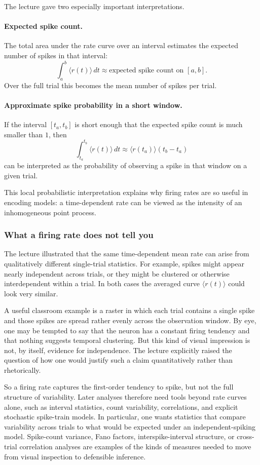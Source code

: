 \documentclass[11pt]{article}
\begin{document}
The lecture gave two especially important interpretations.

\paragraph{Expected spike count.}
The total area under the rate curve over an interval estimates the expected number of spikes in that interval:
\[
\int_a^b \langle r(t) \rangle\,dt \approx \text{expected spike count on } [a,b].
\]
Over the full trial this becomes the mean number of spikes per trial.

\paragraph{Approximate spike probability in a short window.}
If the interval $[t_a,t_b]$ is short enough that the expected spike count is much smaller than $1$, then
\[
\int_{t_a}^{t_b} \langle r(t) \rangle\,dt
\approx \langle r(t_a) \rangle (t_b-t_a)
\]
can be interpreted as the probability of observing a spike in that window on a given trial.

This local probabilistic interpretation explains why firing rates are so useful in encoding models: a time-dependent rate can be viewed as the intensity of an inhomogeneous point process.

\subsubsection{What a firing rate does not tell you}

The lecture illustrated that the same time-dependent mean rate can arise from qualitatively different single-trial statistics. For example, spikes might appear nearly independent across trials, or they might be clustered or otherwise interdependent within a trial. In both cases the averaged curve $\langle r(t) \rangle$ could look very similar.

A useful classroom example is a raster in which each trial contains a single spike and those spikes are spread rather evenly across the observation window. By eye, one may be tempted to say that the neuron has a constant firing tendency and that nothing suggests temporal clustering. But this kind of visual impression is not, by itself, evidence for independence. The lecture explicitly raised the question of how one would justify such a claim quantitatively rather than rhetorically.

So a firing rate captures the first-order tendency to spike, but not the full structure of variability. Later analyses therefore need tools beyond rate curves alone, such as interval statistics, count variability, correlations, and explicit stochastic spike-train models. In particular, one wants statistics that compare variability across trials to what would be expected under an independent-spiking model. Spike-count variance, Fano factors, interspike-interval structure, or cross-trial correlation analyses are examples of the kinds of measures needed to move from visual inspection to defensible inference.
\end{document}
